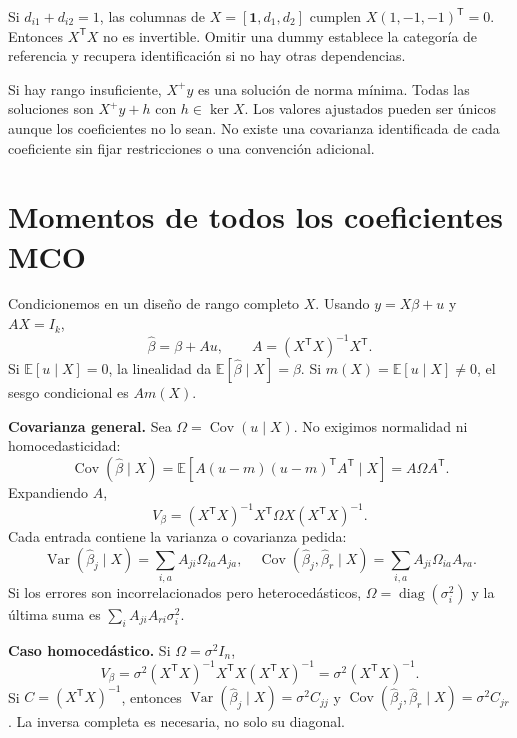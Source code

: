 \documentclass[11pt,a4paper]{article}
\newcommand{\E}{\mathbb E}
\newcommand{\T}{^{\mathsf T}}
\newcommand{\ones}{\mathbf 1}
\DeclareMathOperator{\Var}{Var}
\DeclareMathOperator{\Cov}{Cov}
\DeclareMathOperator{\diag}{diag}
\newcommand{\topic}[2]{\clearpage\section{#1}\label{#2}}
\theoremstyle{definition}\newtheorem{definicion}[teorema]{Definición}
\begin{document}
\begin{ejemplo}
Si $d_{i1}+d_{i2}=1$, las columnas de $X=[\ones,d_1,d_2]$
cumplen $X(1,-1,-1)\T=0$.
Entonces $X\T X$ no es invertible. Omitir una dummy establece la
categoría de referencia y recupera identificación si no hay otras dependencias.
\end{ejemplo}
Si hay rango insuficiente, $X^+y$ es una solución de norma mínima.
Todas las soluciones son $X^+y+h$ con $h\in\ker X$.
Los valores ajustados pueden ser únicos aunque los coeficientes no lo sean.
No existe una covarianza identificada de cada coeficiente sin fijar
restricciones o una convención adicional.

\topic{Momentos de todos los coeficientes MCO}{s34}
Condicionemos en un diseño de rango completo $X$.
Usando $y=X\beta+u$ y $AX=I_k$,
\[
\boxed{\widehat\beta=\beta+Au},\qquad
A=(X\T X)^{-1}X\T.
\]
Si $\E[u\mid X]=0$, la linealidad da
$\E[\widehat\beta\mid X]=\beta$.
Si $m(X)=\E[u\mid X]\ne0$, el sesgo condicional es $Am(X)$.

\textbf{Covarianza general.}
Sea $\Omega=\Cov(u\mid X)$. No exigimos normalidad ni homocedasticidad:
\[
\Cov(\widehat\beta\mid X)
=\E[A(u-m)(u-m)\T A\T\mid X]
=\boxed{A\Omega A\T}.
\]
Expandiendo $A$,
\[
\boxed{V_\beta=(X\T X)^{-1}X\T\Omega X(X\T X)^{-1}}.
\]
Cada entrada contiene la varianza o covarianza pedida:
\[
\Var(\widehat\beta_j\mid X)=\sum_{i,a}A_{ji}\Omega_{ia}A_{ja},
\quad
\Cov(\widehat\beta_j,\widehat\beta_r\mid X)
=\sum_{i,a}A_{ji}\Omega_{ia}A_{ra}.
\]
Si los errores son incorrelacionados pero heterocedásticos,
$\Omega=\diag(\sigma_i^2)$ y la última suma es
$\sum_i A_{ji}A_{ri}\sigma_i^2$.

\textbf{Caso homocedástico.} Si $\Omega=\sigma^2I_n$,
\[
V_\beta=\sigma^2(X\T X)^{-1}X\T X(X\T X)^{-1}
=\boxed{\sigma^2(X\T X)^{-1}}.
\]
Si $C=(X\T X)^{-1}$, entonces
$\Var(\widehat\beta_j\mid X)=\sigma^2 C_{jj}$ y
$\Cov(\widehat\beta_j,\widehat\beta_r\mid X)=\sigma^2 C_{jr}$.
La inversa completa es necesaria, no solo su diagonal.
\end{document}
